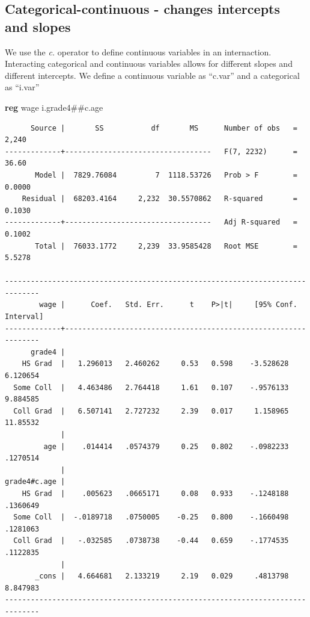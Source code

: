 \documentclass[
]{book}
\newenvironment{Shaded}{\begin{snugshade}}{\end{snugshade}}
\newcommand{\KeywordTok}[1]{\textcolor[rgb]{0.13,0.29,0.53}{\textbf{#1}}}
\newcommand{\NormalTok}[1]{#1}
\begin{document}
\subsection{Categorical-continuous - changes intercepts and slopes}\label{categorical-continuous---changes-intercepts-and-slopes}

We use the \emph{c.} operator to define continuous variables in an internaction. Interacting categorical and continuous variables allows for different slopes and different intercepts. We define a continuous variable as ``c.var'' and a categorical as ``i.var''

\begin{Shaded}
\begin{Highlighting}[]
\KeywordTok{reg}\NormalTok{ wage i.grade4\#\#c.age}
\end{Highlighting}
\end{Shaded}

\begin{verbatim}
      Source |       SS           df       MS      Number of obs   =     2,240
-------------+----------------------------------   F(7, 2232)      =     36.60
       Model |  7829.76084         7  1118.53726   Prob > F        =    0.0000
    Residual |  68203.4164     2,232  30.5570862   R-squared       =    0.1030
-------------+----------------------------------   Adj R-squared   =    0.1002
       Total |  76033.1772     2,239  33.9585428   Root MSE        =    5.5278

------------------------------------------------------------------------------
        wage |      Coef.   Std. Err.      t    P>|t|     [95% Conf. Interval]
-------------+----------------------------------------------------------------
      grade4 |
    HS Grad  |   1.296013   2.460262     0.53   0.598    -3.528628    6.120654
  Some Coll  |   4.463486   2.764418     1.61   0.107    -.9576133    9.884585
  Coll Grad  |   6.507141   2.727232     2.39   0.017     1.158965    11.85532
             |
         age |    .014414   .0574379     0.25   0.802    -.0982233    .1270514
             |
grade4#c.age |
    HS Grad  |    .005623   .0665171     0.08   0.933    -.1248188    .1360649
  Some Coll  |  -.0189718   .0750005    -0.25   0.800    -.1660498    .1281063
  Coll Grad  |   -.032585   .0738738    -0.44   0.659    -.1774535    .1122835
             |
       _cons |   4.664681   2.133219     2.19   0.029     .4813798    8.847983
------------------------------------------------------------------------------
\end{verbatim}
\end{document}
